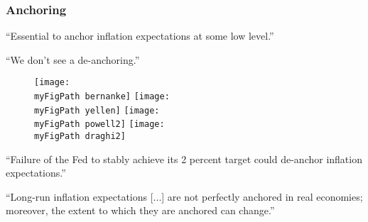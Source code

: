 \documentclass[10pt]{beamer}
\def \myFigPath {../../../figures/}
\begin{document}
\begin{frame}
	\frametitle{Anchoring}
	\label{central_bankers}
	``Essential to anchor inflation expectations at some low level.''
	
	\vspace{0.2cm}
	
	\hfill ``We don't see a de-anchoring.''

\begin{figure}[h!]
\texttt{[image: \\myFigPath bernanke]}
\texttt{[image: \\myFigPath yellen]}
\texttt{[image: \\myFigPath powell2]}
\texttt{[image: \\myFigPath draghi2]}
\label{central_bankers_talk}
\end{figure}

``Failure of the Fed to stably achieve its 2 percent target could de-anchor inflation expectations.''

	\vspace{0.4cm}
	
``Long-run inflation expectations [...] are not perfectly anchored in real economies; moreover, the extent to which they are anchored can change.''

%
%
%
%
	\end{frame}
\end{document}

